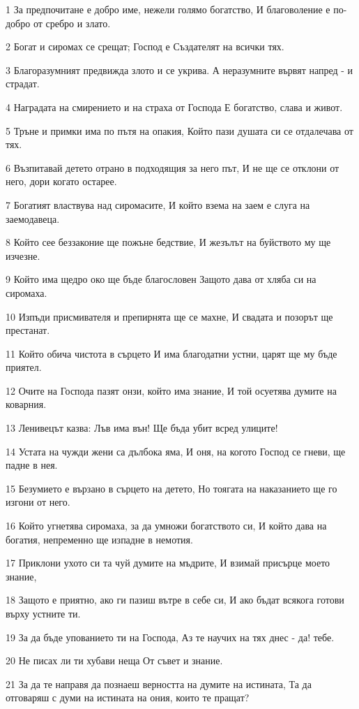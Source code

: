 \par 1 За предпочитане е добро име, нежели голямо богатство, И благоволение е по-добро от сребро и злато.
\par 2 Богат и сиромах се срещат; Господ е Създателят на всички тях.
\par 3 Благоразумният предвижда злото и се укрива. А неразумните вървят напред - и страдат.
\par 4 Наградата на смирението и на страха от Господа Е богатство, слава и живот.
\par 5 Тръне и примки има по пътя на опакия, Който пази душата си се отдалечава от тях.
\par 6 Възпитавай детето отрано в подходящия за него път, И не ще се отклони от него, дори когато остарее.
\par 7 Богатият властвува над сиромасите, И който взема на заем е слуга на заемодавеца.
\par 8 Който сее беззаконие ще пожъне бедствие, И жезълът на буйството му ще изчезне.
\par 9 Който има щедро око ще бъде благословен Защото дава от хляба си на сиромаха.
\par 10 Изпъди присмивателя и препирнята ще се махне, И свадата и позорът ще престанат.
\par 11 Който обича чистота в сърцето И има благодатни устни, царят ще му бъде приятел.
\par 12 Очите на Господа пазят онзи, който има знание, И той осуетява думите на коварния.
\par 13 Ленивецът казва: Лъв има вън! Ще бъда убит всред улиците!
\par 14 Устата на чужди жени са дълбока яма, И оня, на когото Господ се гневи, ще падне в нея.
\par 15 Безумието е вързано в сърцето на детето, Но тоягата на наказанието ще го изгони от него.
\par 16 Който угнетява сиромаха, за да умножи богатството си, И който дава на богатия, непременно ще изпадне в немотия.
\par 17 Приклони ухото си та чуй думите на мъдрите, И взимай присърце моето знание,
\par 18 Защото е приятно, ако ги пазиш вътре в себе си, И ако бъдат всякога готови върху устните ти.
\par 19 За да бъде упованието ти на Господа, Аз те научих на тях днес - да! тебе.
\par 20 Не писах ли ти хубави неща От съвет и знание.
\par 21 За да те направя да познаеш верността на думите на истината, Та да отговаряш с думи на истината на ония, които те пращат?
